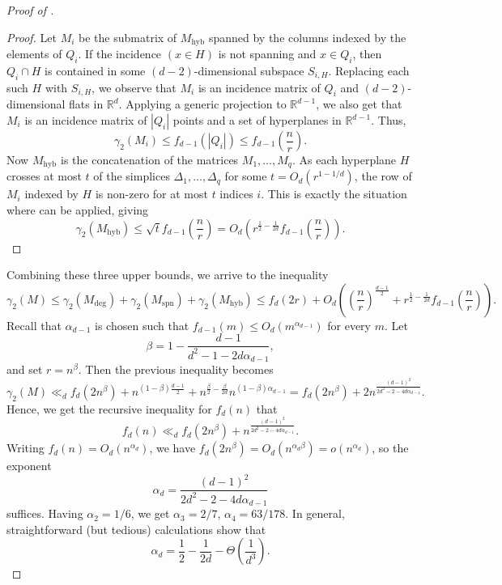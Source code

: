 \documentclass[11pt]{article}
\theoremstyle{plain}
\theoremstyle{definition}
\begin{document}
\begin{proof}[Proof of ]
		\begin{proof}
			Let $M_i$ be the submatrix of $M_{\text{hyb}}$ spanned by the columns indexed by the elements of $Q_i$. If the incidence $(x\in H)$ is not spanning and $x\in Q_i$, then $Q_i\cap H$ is contained in some $(d-2)$-dimensional subspace $S_{i,H}$. Replacing each such $H$ with $S_{i,H}$, we observe that $M_i$ is an incidence matrix of $Q_i$ and $(d-2)$-dimensional flats in $\mathbb{R}^d$. Applying a generic projection to $\mathbb{R}^{d-1}$, we also get that $M_i$ is an  incidence matrix of $|Q_i|$ points and a set of hyperplanes in $\mathbb{R}^{d-1}$. Thus, 
			$$\gamma_2(M_i)\leq f_{d-1}(|Q_i|)\leq f_{d-1}\left(\frac{n}{r}\right).$$
			Now $M_{\text{hyb}}$ is the concatenation of the matrices $M_1,\dots,M_q$. As each hyperplane $H$ crosses at most $t$ of the simplices $\Delta_1,\dots,\Delta_q$ for some $t=O_d(r^{1-1/d})$, the row of $M_i$ indexed by $H$ is non-zero for at most $t$ indices $i$. This is exactly the situation where  can be applied, giving 
			$$\gamma_2(M_{\text{hyb}})\leq \sqrt{t}f_{d-1}\left(\frac{n}{r}\right)=O_d\left(r^{\frac{1}{2}-\frac{1}{2d}}f_{d-1}\left(\frac{n}{r}\right)\right).$$
		\end{proof}
		\noindent
		Combining these three upper bounds, we arrive to the inequality
		$$\gamma_2(M)\leq \gamma_2(M_{\text{deg}})+\gamma_2(M_{\text{spn}})+\gamma_2(M_{\text{hyb}})\leq f_d(2r)+O_d\left(\left(\frac{n}{r}\right)^{\frac{d-1}{2}}+r^{\frac{1}{2}-\frac{1}{2d}}f_{d-1}\left(\frac{n}{r}\right)\right).$$
		Recall that $\alpha_{d-1}$ is chosen such that $f_{d-1}(m)\leq O_d(m^{\alpha_{d-1}})$ for every $m$. Let 
		$$\beta=1-\frac{d-1}{d^2-1-2d\alpha_{d-1}},$$ and set $r=n^{\beta}$. Then the previous inequality becomes
		$$\gamma_2(M)\ll_d f_d(2n^{\beta})+n^{(1-\beta)\frac{d-1}{2}}+n^{\frac{\beta}{2}-\frac{\beta}{2d}}n^{(1-\beta)\alpha_{d-1}}=f_d(2n^{\beta})+2n^{\frac{(d-1)^2}{2d^2-2-4d\alpha_{d-1}}}.$$
		Hence, we get the recursive inequality for $f_d(n)$ that
		$$f_d(n)\ll_d f_d(2n^{\beta})+n^{\frac{(d-1)^2}{2d^2-2-4d\alpha_{d-1}}}.$$
		Writing $f_d(n)=O_d(n^{\alpha_d})$, we have $f_d(2n^{\beta})=O_d(n^{\alpha_d \beta})=o(n^{\alpha_d})$, so the exponent
		$$\alpha_d=\frac{(d-1)^2}{2d^2-2-4d\alpha_{d-1}}$$
		suffices. Having $\alpha_2=1/6$, we get $\alpha_3=2/7$, $\alpha_4=63/178$. In general, straightforward (but tedious) calculations show that 
		$$\alpha_d=\frac{1}{2}-\frac{1}{2d}-\Theta\left(\frac{1}{d^3}\right).$$
	\end{proof}
	
	
	
\end{document}
